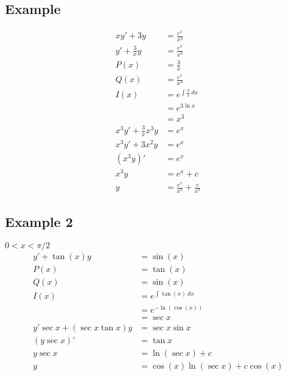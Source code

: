 \documentclass{article}
\theoremstyle{mytheoremstyle}
\theoremstyle{mytheoremstyle}
\theoremstyle{myproblemstyle}
\begin{document}
    \subsection*{Example}
    \begin{align*}
        xy' + 3y &= \frac{e^x}{x^2} \\
        y' + \frac{3}{x} y &= \frac{e^x}{x^3} \\
        P(x) &= \frac{3}{x} \\
        Q(x) &= \frac{e^x}{x^3} \\
        I(x) &= e^{\int \frac{3}{x} \ dx} \\
        &= e^{3\ln x} \\
        &= x^3 \\
        x^3y' + \frac{3}{x} x^3 y &= e^x \\
        x^3y' + 3x^2 y &= e^x \\
        (x^3y)' &= e^x \\
        x^3y &= e^x + c \\
        y &= \frac{e^x}{x^3} + \frac{c}{x^3}
    \end{align*}

    \subsection*{Example 2}
    $0 < x < \pi/2$
    \begin{align*}
        y' + \tan(x)y &= \sin(x) \\
        P(x) &= \tan(x) \\
        Q(x) &= \sin(x) \\
        I(x) &= e^{\int \tan(x) \ dx} \\
             &= e^{-\ln(\cos(x))} \\
             &= \sec x \\
        y'\sec x + (\sec x \tan x) y &= \sec x \sin x \\
        (y\sec x)' &= \tan x \\
        y\sec x &= \ln(\sec x) + c \\
        y &= \cos(x)\ln(\sec x) + c\cos(x)
    \end{align*}
\end{document}
